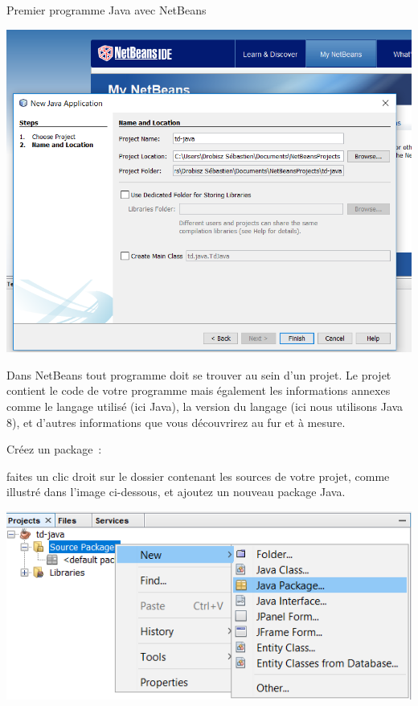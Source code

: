 \documentclass[a4paper,11pt]{article}
\begin{document}
\begin{Tutoriel}{Premier programme Java avec NetBeans}
\begin{steps}
			\begin{center}
				\includegraphics[width=\textwidth]{images/nb_newproject_name}
			\end{center}
			
			Dans NetBeans tout programme doit se trouver au sein d'un projet.
			Le projet contient le code de votre programme mais également les 
			informations annexes comme le langage utilisé (ici Java), 
			la version du langage (ici nous utilisons Java 8), 
			et d'autres informations que vous découvrirez au fur et à mesure.



		\item Créez un package~: 
		
			faites un clic droit sur le dossier contenant les sources de votre projet, 
			comme illustré dans l'image ci-dessous, et ajoutez un nouveau package Java.
		
			\bigskip
			\begin{center}
				\includegraphics[width=\textwidth]{images/nb_newproject_package}
			\end{center}


\end{steps}
\end{Tutoriel}
\end{document}
